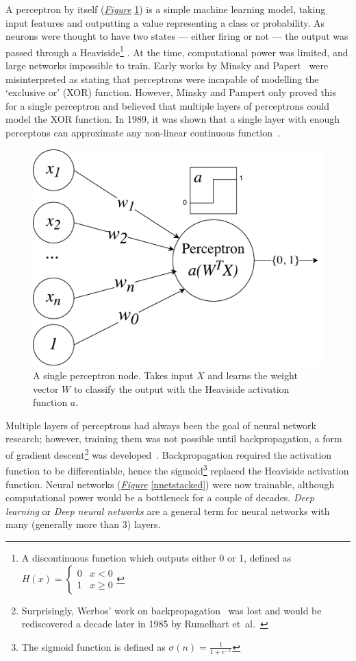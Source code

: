 \documentclass[12pt, twoside]{book}
\renewcommand\emph[1]{\textit{\color{USred}{#1}}}
\begin{document}
A perceptron by itself (\textit{\hyperref[perceptronvis]{Figure}} \ref{perceptronvis}) is a simple machine learning model, taking input features  and outputting a value representing a class or probability. As neurons were thought to have two states --- either firing or not --- the output was passed through a Heaviside\footnote{A discontinuous function which outputs either 0 or 1, defined as $ H(x)=\begin{cases} 
      0 & x < 0 \\
      1 & x \geq 0 
   \end{cases}
$} \emph{activation function}. At the time, computational power was limited, and large networks impossible to train. Early works by Minsky and Papert~\cite{minsky1969perceptrons} were misinterpreted as stating that perceptrons were incapable of modelling the `exclusive or' (XOR) function. However, Minsky and Pampert only proved this for a single perceptron and believed that multiple layers of perceptrons could model the XOR function. In 1989, it was shown that a single layer with enough perceptons can approximate any non-linear continuous function~\cite{nnuniversalapprox}.


\begin{figure}[!htb]
\centering\includegraphics[width=0.5\linewidth]{perceptron.pdf}
\caption{A single perceptron node. Takes input $X$ and learns the weight vector $W$ to classify the output with the Heaviside activation function $a$.}
\label{perceptronvis}
\end{figure}

Multiple layers of perceptrons had always been the goal of neural network research; however, training them was not possible until backpropagation, a form of gradient descent\footnote{Surprisingly, Werbos' work on backpropagation~\cite{werbos1974beyond}  was lost and would be rediscovered a decade later in 1985 by Rumelhart et~al.~\cite{backproprediscover}} was developed~\cite{werbos1974beyond}. Backpropagation required the activation function to be differentiable, hence the sigmoid\footnote{The sigmoid function is defined as $\sigma(n) = \frac{1}{1+e^{-x}}$}  replaced the Heaviside activation function. Neural networks (\textit{\hyperref[nnetstacked]{Figure}} \ref{nnetstacked}) were now trainable, although computational power would be a bottleneck for a couple of decades. \textit{Deep learning} or \textit{Deep neural networks} are a general term for neural networks with many (generally more than 3) layers.
\end{document}
